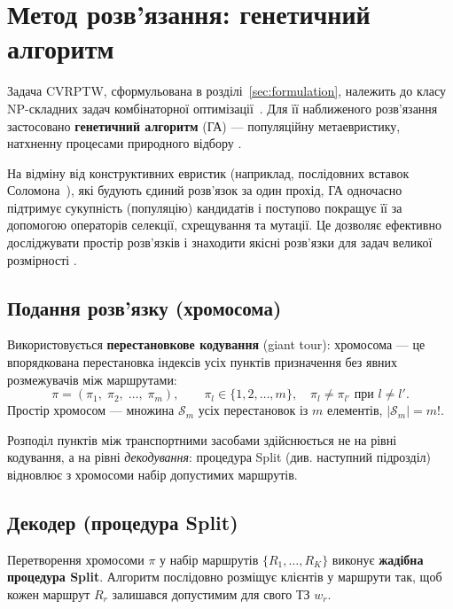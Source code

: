 \documentclass[14pt,a4paper]{extarticle}
\theoremstyle{definition}
\theoremstyle{plain}
\begin{document}
\section{Метод розв'язання: генетичний алгоритм}\label{sec:ga}

Задача CVRPTW, сформульована в розділі~\ref{sec:formulation}, належить до класу NP-складних задач комбінаторної оптимізації~\cite{toth2014}. Для її наближеного розв'язання застосовано \textbf{генетичний алгоритм} (ГА) --- популяційну метаевристику, натхненну процесами природного відбору \cite{holland1975, goldberg1989}.

На відміну від конструктивних евристик (наприклад, послідовних вставок Соломона~\cite{solomon1987}), які будують єдиний розв'язок за один прохід, ГА одночасно підтримує сукупність (популяцію) кандидатів і поступово покращує її за допомогою операторів селекції, схрещування та мутації. Це дозволяє ефективно досліджувати простір розв'язків і знаходити якісні розв'язки для задач великої розмірності \cite{prins2004, braysy2005}.

\subsection{Подання розв'язку (хромосома)}

Використовується \textbf{перестановкове кодування} (giant tour): хромосома --- це впорядкована перестановка індексів усіх пунктів призначення без явних розмежувачів між маршрутами:
\[
    \pi = (\pi_1,\; \pi_2,\; \ldots,\; \pi_m), \qquad
    \pi_l \in \{1, 2, \ldots, m\}, \quad
    \pi_l \neq \pi_{l'} \text{ при } l \neq l'.
\]
Простір хромосом --- множина $\mathcal{S}_m$ усіх перестановок із $m$ елементів, $|\mathcal{S}_m| = m!$.

Розподіл пунктів між транспортними засобами здійснюється не на рівні кодування, а на рівні \textit{декодування}: процедура Split (див. наступний підрозділ) відновлює з хромосоми набір допустимих маршрутів.

\subsection{Декодер (процедура Split)}\label{subsec:split}

Перетворення хромосоми $\pi$ у набір маршрутів $\{R_1, \ldots, R_K\}$ виконує \textbf{жадібна процедура Split}. Алгоритм послідовно розміщує клієнтів у маршрути так, щоб кожен маршрут $R_r$ залишався допустимим для свого ТЗ $w_r$.
\end{document}
